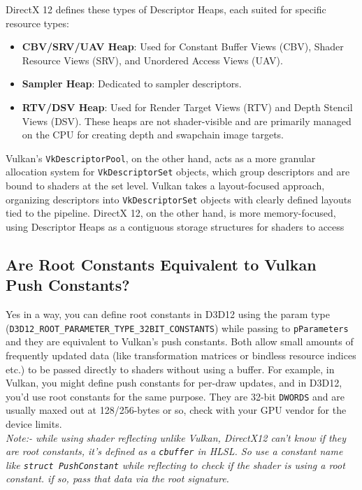 \documentclass{article}
\begin{document}
DirectX 12 defines these types of Descriptor Heaps, each suited for specific resource types:
\begin{itemize}
    \item \textbf{CBV/SRV/UAV Heap}: Used for Constant Buffer Views (CBV), Shader Resource Views (SRV), and Unordered Access Views (UAV).
    \item \textbf{Sampler Heap}: Dedicated to sampler descriptors.
    \item \textbf{RTV/DSV Heap}: Used for Render Target Views (RTV) and Depth Stencil Views (DSV). These heaps are not shader-visible and are primarily managed on the CPU for creating depth and swapchain image targets.
    
\end{itemize}

Vulkan's \lstinline{VkDescriptorPool}, on the other hand, acts as a more granular allocation system for \lstinline{VkDescriptorSet} objects, which group descriptors and are bound to shaders at the set level. Vulkan takes a layout-focused approach, organizing descriptors into \lstinline{VkDescriptorSet} objects with clearly defined layouts tied to the pipeline. DirectX 12, on the other hand, is more memory-focused, using Descriptor Heaps as a contiguous storage structures for shaders to access

\subsection*{Are Root Constants Equivalent to Vulkan Push Constants?}
Yes in a way, you can define root constants in D3D12 using the param type (\lstinline{D3D12_ROOT_PARAMETER_TYPE_32BIT_CONSTANTS}) while passing to \lstinline{pParameters} and they are equivalent to Vulkan's push constants. Both allow small amounts of frequently updated data (like transformation matrices or bindless resource indices etc.) to be passed directly to shaders without using a buffer. For example, in Vulkan, you might define push constants for per-draw updates, and in D3D12, you'd use root constants for the same purpose. They are 32-bit \lstinline{DWORDS} and are usually maxed out at 128/256-bytes or so, check with your GPU vendor for the device limits. \\

\textit{Note:- while using shader reflecting unlike Vulkan, DirectX12 can't know if they are root constants, it's defined as a \lstinline{cbuffer} in HLSL. So use a constant name like \lstinline{struct PushConstant} while reflecting to check if the shader is using a root constant. if so, pass that data via the root signature.}
\end{document}
